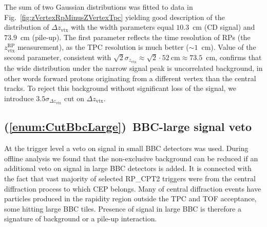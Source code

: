The sum of two Gaussian distributions was fitted to data in Fig.~\ref{fig:zVertexRpMinusZVertexTpc} yielding good description of the distribution of $\Delta z_{\text{vtx}}$ with the width parameters equal $10.3$~cm (CD signal) and $73.9$~cm (pile-up). The first parameter reflects the time resolution of RPs (the $z_{\text{vtx}}^{\text{RP}}$ measurement), as the TPC resolution is much better ($\sim 1$~cm). Value of the second parameter, consistent with $\sqrt{2}\sigma_{z_{\text{vtx}}}\approx\sqrt{2}\cdot52~\text{cm}\approx 73.5$~cm, confirms that the wide distribution under the narrow signal peak is uncorrelated background, in other words forward protons originating from a different vertex than the central tracks. To reject this background without significant loss of the signal, we introduce $3.5\sigma_{\Delta z_{\text{vtx}}}$ cut on $\Delta z_{\text{vtx}}$.






\subsection{(\ref{enum:CutBbcLarge})~BBC-large signal veto}\label{sec:C6}

At the trigger level a veto on signal in small BBC detectors was used. During offline analysis we found that the non-exclusive background can be reduced if an additional veto on signal in large BBC detectors is added. It is connected with the fact that vast majority of selected RP\_CPT2 triggers were from the central diffraction process to which CEP belongs. Many of central diffraction events have particles produced in the rapidity region outside the TPC and TOF acceptance, some hitting large BBC tiles. Presence of signal in large BBC is therefore a signature of background or a pile-up interaction.

